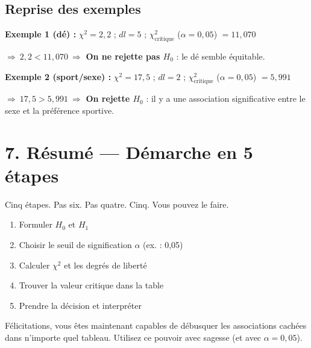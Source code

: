 \documentclass[12pt, a4paper]{article}
\begin{document}
\subsection{Reprise des exemples}

\textbf{Exemple 1 (dé) :} $\chi^2 = 2{,}2$ ; $dl = 5$ ;
$\chi^2_{\text{critique}}$ ($\alpha = 0{,}05$) $= 11{,}070$

$\Rightarrow\ 2{,}2 < 11{,}070\ \Rightarrow$ \textbf{On ne rejette pas $H_0$} :
le dé semble équitable.

\vspace{0.5em}

\textbf{Exemple 2 (sport/sexe) :} $\chi^2 = 17{,}5$ ; $dl = 2$ ;
$\chi^2_{\text{critique}}$ ($\alpha = 0{,}05$) $= 5{,}991$

$\Rightarrow\ 17{,}5 > 5{,}991\ \Rightarrow$ \textbf{On rejette $H_0$} :
il y a une association significative entre le sexe et la préférence sportive.

\section{7. Résumé --- Démarche en 5 étapes}

\begin{humourbox}
Cinq étapes. Pas six. Pas quatre. Cinq. Vous pouvez le faire.
\end{humourbox}

\vspace{0.5em}

\begin{resumebox}
\begin{enumerate}
  \item Formuler $H_0$ et $H_1$
  \item Choisir le seuil de signification $\alpha$ (ex. : 0,05)
  \item Calculer $\chi^2$ et les degrés de liberté
  \item Trouver la valeur critique dans la table
  \item Prendre la décision et interpréter
\end{enumerate}
\end{resumebox}

\vspace{0.5em}

\begin{humourbox}
Félicitations, vous êtes maintenant capables de débusquer les associations cachées dans
n'importe quel tableau. Utilisez ce pouvoir avec sagesse (et avec $\alpha = 0{,}05$).
\end{humourbox}
\end{document}
